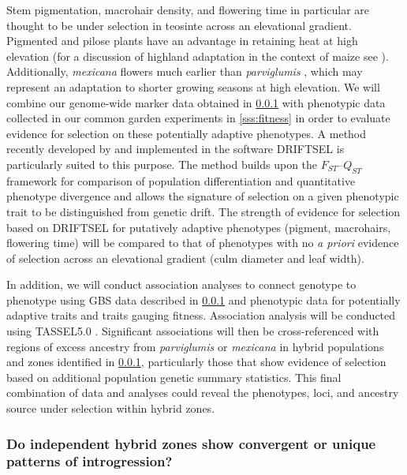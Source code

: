 Stem pigmentation, macrohair density, and flowering time in particular are thought to be under selection in teosinte across an elevational gradient.  Pigmented and pilose plants have an advantage in retaining heat at high elevation (for a discussion of highland adaptation in the context of maize see \citealt{Eagles1994}). Additionally, \emph{mexicana} flowers much earlier than \emph{parviglumis} \citep{Rodriguez2006}, which may represent an adaptation to shorter growing seasons at high elevation. We will combine our genome-wide marker data obtained in \ref{sss:genomescan} with phenotypic data collected in our common garden experiments in \ref{sss:fitness} in order to evaluate evidence for selection on these potentially adaptive phenotypes.  A method recently developed by \citet{Ovaskainen2011} and implemented in the software DRIFTSEL \citep{Karhunen2013} is particularly suited to this purpose.  The method builds upon the $F_{ST}$--$Q_{ST}$  framework for comparison of population differentiation and quantitative phenotype divergence and allows the signature of selection on a given phenotypic trait to be distinguished from genetic drift.  The strength of evidence for selection based on DRIFTSEL for putatively adaptive phenotypes (pigment, macrohairs, flowering time) will be compared to that of phenotypes with no \emph{a priori} evidence of selection across an elevational gradient (culm diameter and leaf width). 

In addition, we will conduct association analyses to connect genotype to phenotype using GBS data described in \ref{sss:genomescan} and phenotypic data for potentially adaptive traits and traits gauging fitness.  Association analysis will be conducted using TASSEL5.0 \citep{Bradbury2007}. Significant associations will then be cross-referenced with regions of excess ancestry from \emph{parviglumis} or \emph{mexicana} in hybrid populations and zones identified in \ref{sss:genomescan}, particularly those that show evidence of selection based on additional population genetic summary statistics.  This final combination of data and analyses could reveal the phenotypes, loci, and ancestry source under selection within hybrid zones.

\subsubsection{Do independent hybrid zones show convergent or unique patterns of introgression?}
\label{sss:genomescan}

